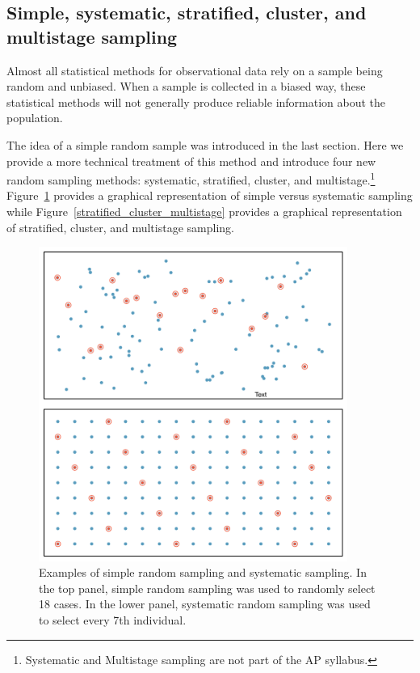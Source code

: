 

\subsection[Simple, systematic, stratified, cluster, and multistage sampling]{Simple, systematic, stratified, cluster, and\\multistage sampling}
\label{threeSamplingMethods}

Almost all statistical methods for observational data rely on a sample being random and unbiased. When a sample is collected in a biased way, these statistical methods will not generally produce reliable information about the population.

The idea of a simple random sample was introduced in the last section. Here we provide a more technical treatment of this method and introduce four new random sampling methods: systematic, stratified, cluster, and multistage.\footnote{Systematic and Multistage sampling are not part of the AP syllabus.} Figure~\ref{simple_systematic} provides a graphical representation of simple versus systematic sampling while Figure~\ref{stratified_cluster_multistage} provides a graphical representation of stratified, cluster, and multistage sampling.


\begin{figure}
\centering
\includegraphics[width=0.9\textwidth]{ch_data_collection/figures/samplingMethodsFigure/simple_systematic}
\caption{Examples of simple random sampling and systematic sampling. In the top panel, simple random sampling was used to randomly select 18 cases. In the lower panel, systematic random sampling was used to select every 7th individual.}
\label{simple_systematic}
\end{figure}

